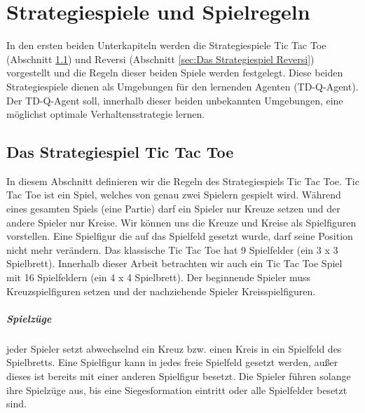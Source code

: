 \chapter{Strategiespiele und Spielregeln}
\label{cha:Strategiespiele und Spielregeln}

In den ersten beiden Unterkapiteln werden die Strategiespiele Tic Tac Toe (Abschnitt \ref{sec:Das Strategiespiel Tic Tac Toe}) und Reversi (Abschnitt \ref{sec:Das Strategiespiel Reversi}) vorgestellt und die Regeln dieser beiden Spiele werden festgelegt. Diese beiden Strategiespiele dienen als Umgebungen für den lernenden Agenten (TD-Q-Agent). Der TD-Q-Agent soll, innerhalb dieser beiden unbekannten Umgebungen, eine möglichst optimale Verhaltensstrategie lernen. \\


\section{Das Strategiespiel Tic Tac Toe}
\label{sec:Das Strategiespiel Tic Tac Toe}

In diesem Abschnitt definieren wir die Regeln des Strategiespiels Tic Tac Toe. Tic Tac Toe ist ein Spiel, welches von genau zwei Spielern gespielt wird. Während eines gesamten Spiels (eine Partie) darf ein Spieler nur Kreuze setzen und der andere Spieler nur Kreise. Wir können uns die Kreuze und Kreise als Spielfiguren vorstellen. Eine Spielfigur die auf das Spielfeld gesetzt wurde, darf seine Position nicht mehr verändern. Das klassische Tic Tac Toe hat 9 Spielfelder (ein 3 x 3 Spielbrett). Innerhalb dieser Arbeit betrachten wir auch ein Tic Tac Toe Spiel mit 16 Spielfeldern (ein 4 x 4 Spielbrett). Der beginnende Spieler muss Kreuzspielfiguren setzen und der nachziehende Spieler Kreisspielfiguren. \\

\paragraph{Spielzüge} jeder Spieler setzt abwechselnd ein Kreuz bzw. einen Kreis in ein Spielfeld des Spielbretts. Eine Spielfigur kann in jedes freie Spielfeld gesetzt werden, außer dieses ist bereits mit einer anderen Spielfigur besetzt. Die Spieler führen solange ihre Spielzüge aus, bis eine Siegesformation eintritt oder alle Spielfelder besetzt sind. 
\newpage


